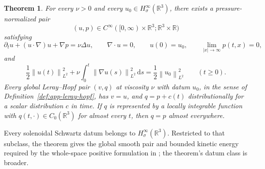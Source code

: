 \documentclass[11pt]{article}
\newtheorem*{maintheorem}{Theorem}
\theoremstyle{definition}
\theoremstyle{remark}
\newcommand{\R}{\mathbb R}
\newcommand{\HsSigma}{H^\infty_\sigma}
\newcommand{\norm}[1]{\left\lVert #1\right\rVert}
\newcommand{\abs}[1]{\left|#1\right|}
\newcommand{\dd}{\,\mathrm d}
\begin{document}
\begin{maintheorem}
For every \(\nu>0\) and every \(u_0\in\HsSigma(\R^3)\), there exists a
pressure-normalized pair
\[
 (u,p)\in C^\infty([0,\infty)\times\R^3;\R^3\times\R)
\]
satisfying
\[
 \partial_tu+(u\cdot\nabla)u+\nabla p=\nu\Delta u,
 \qquad \nabla\cdot u=0,
 \qquad u(0)=u_0,
 \qquad \lim_{\abs{x}\to\infty}p(t,x)=0,
\]
and
\[
 \frac12\norm{u(t)}_{L^2}^2
 +\nu\int_0^t\norm{\nabla u(s)}_{L^2}^2\dd s
 =\frac12\norm{u_0}_{L^2}^2
 \qquad(t\ge0).
\]
Every global Leray--Hopf pair \((v,q)\) at viscosity \(\nu\) with datum
\(u_0\), in the sense of Definition~\ref{def:app-leray-hopf}, has \(v=u\),
and \(q=p+c(t)\) distributionally for a scalar distribution \(c\) in time.
If \(q\) is represented by a locally integrable function with
\(q(t,\cdot)\in C_0(\R^3)\) for almost every \(t\), then \(q=p\) almost
everywhere.
\end{maintheorem}

Every solenoidal Schwartz datum belongs to \(\HsSigma(\R^3)\).  Restricted
to that subclass, the theorem gives the global smooth pair and bounded
kinetic energy required by the whole-space positive formulation in
\cite{Fefferman2006}; the theorem's datum class is broader.











\appendix
\QuantitativeCatalogue
\end{document}
